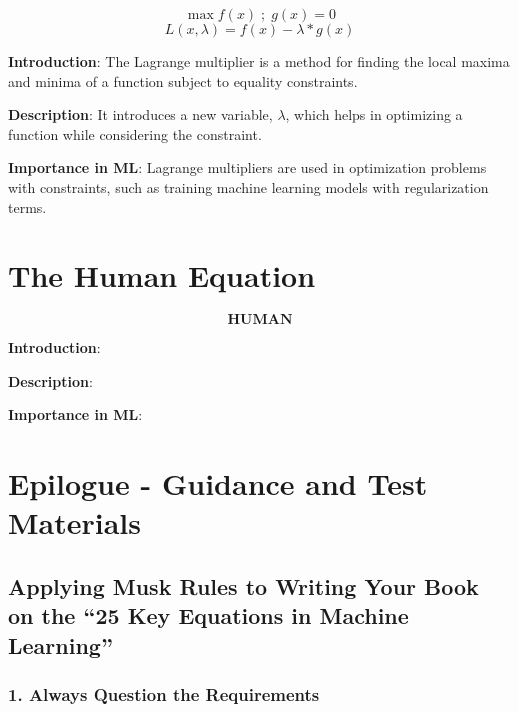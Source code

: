\documentclass[
  12 pt,
  a4paper,
]{book}
\numberwithin{equation}{section}
\theoremstyle{plain}      %
\theoremstyle{definition} %
\theoremstyle{remark}     %
\theoremstyle{note}         %
\begin{document}
\[
\max f(x) \;; \; g(x) = 0
\] \[
L(x, \lambda) = f(x) - \lambda \ast g(x)
\]

\textbf{Introduction}: The Lagrange multiplier is a method for finding
the local maxima and minima of a function subject to equality
constraints.

\textbf{Description}: It introduces a new variable, \(\lambda\), which
helps in optimizing a function while considering the constraint.

\textbf{Importance in ML}: Lagrange multipliers are used in optimization
problems with constraints, such as training machine learning models with
regularization terms.

\newpage

\hypertarget{the-human-equation}{%
\chapter{The Human Equation}\label{the-human-equation}}

\[
\textbf{HUMAN}
\]

\textbf{Introduction}:

\textbf{Description}:

\textbf{Importance in ML}:

\newpage

\backmatter

\hypertarget{epilogue---guidance-and-test-materials}{%
\chapter{Epilogue - Guidance and Test
Materials}\label{epilogue---guidance-and-test-materials}}

\hypertarget{applying-musk-rules-to-writing-your-book-on-the-25-key-equations-in-machine-learning}{%
\section*{Applying Musk Rules to Writing Your Book on the ``25 Key
Equations in Machine
Learning''}\label{applying-musk-rules-to-writing-your-book-on-the-25-key-equations-in-machine-learning}}

\hypertarget{always-question-the-requirements}{%
\subsection*{\texorpdfstring{1. \textbf{Always Question the
Requirements}}{1. Always Question the Requirements}}\label{always-question-the-requirements}}
\end{document}
